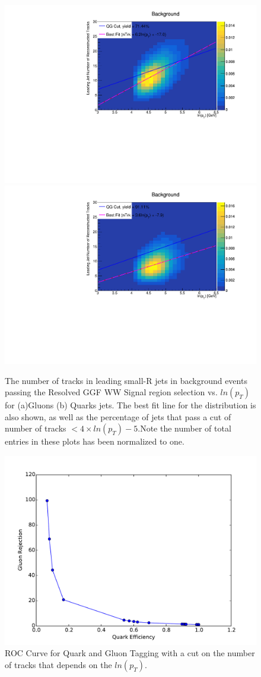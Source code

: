 \begin{figure}[h!]
  \centering
  \includegraphics[width=0.45\hsize]{figures/QGT/gluonheatmaps/allbkg-ade_Pass_Res_GGF_WW_SR_sigWJ1_nTrkgluon.pdf}
 \includegraphics[width=0.45\hsize]{figures/QGT/quarkheatmaps/allbkg-ade_Pass_Res_GGF_WW_SR_sigWJ1_nTrkquark.pdf}
  \caption{The number of tracks in leading small-R jets in background events passing the Resolved GGF WW Signal region selection vs. $ln(p_{T})$ for (a)Gluons (b) Quarks jets. The best fit line for the distribution is also shown, as well as the percentage of jets that pass a cut of number of tracks $< 4\times ln(p_{T}) -5$.Note the number of total entries in these plots has been normalized to one.}
  \label{fig:quark_gluon_heatmap}
\end{figure}
\FloatBarrier



\begin{figure}[h!]
  \centering
  \includegraphics[width=\hsize]{figures/QGT/finalroc.pdf}
  \caption{ROC Curve for Quark and Gluon Tagging with a cut on the number of tracks that depends on the $ln(p_{T})$.}
  \label{fig:quark_gluon_roc}
\end{figure}
\FloatBarrier


